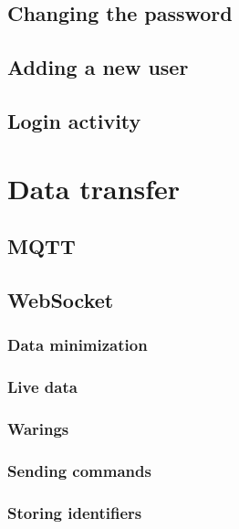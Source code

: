 \subsection{Changing the password}
\label{subsec:changing_the_password}



\subsection{Adding a new user}
\label{subsec:adding_a_new_user}



\subsection{Login activity}
\label{subsec:login_activity}





\section{Data transfer}
\label{sec:data_transfer}



\subsection{MQTT}
\label{subsec:mqtt}



\subsection{WebSocket}
\label{subsec:websocket}


\subsubsection{Data minimization}
\label{subsec:data_minimization}


\subsubsection{Live data}
\label{subsec:live_data}


\subsubsection{Warings}
\label{subsec:warnings}


\subsubsection{Sending commands}
\label{subsec:sending_commands}


\subsubsection{Storing identifiers}
\label{subsec:storing_identifiers}
